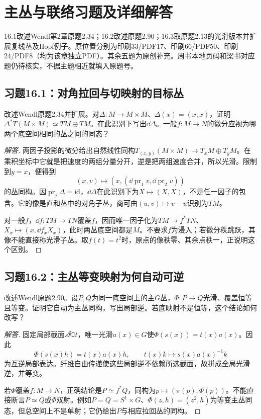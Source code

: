 \section{主丛与联络习题及详细解答}
16.1改述Wendl第2章原题2.34；16.2改述原题2.90；16.3取原题2.13的光滑版本并扩展复线丛及Hopf例子。原位置分别为印刷33/PDF17、印刷66/PDF50、印刷24/PDF8（均为该章独立PDF）。其余五题为原创补充。周书本地页码和梁书对应题仍待核实，不据主题相近就填入原题号。

\subsection*{习题16.1：对角拉回与切映射的目标丛}
改述Wendl原题2.34并扩展。对$\Delta:M\to M\times M$、$\Delta(x)=(x,x)$，证明$\Delta^*T(M\times M)\simeq TM\oplus TM$。在此识别下写出$\dd\Delta$。一般$f:M\to N$的微分应视为哪两个底空间相同的丛之间的同态？
\begin{proof}[解答]
两因子投影的微分给出自然线性同构$T_{(x,y)}(M\times M)\to T_xM\oplus T_yM$。在乘积坐标中它就是把速度的两组分量分开，逆是把两组速度合并，所以光滑。限制到$y=x$，便得到
\[
 (x,v)\longmapsto(x,(\dd\operatorname{pr}_1v,\dd\operatorname{pr}_2v))
\]
的丛同构。因$\operatorname{pr}_j\Delta=\mathrm{id}$，$\dd\Delta$在此识别下为$X\mapsto(X,X)$，不是任一因子的包含。它的像是直和丛中的对角子丛，商可由$(u,v)\mapsto v-u$识别为$TM$。

对一般$f$，$\dd f:TM\to TN$覆盖$f$，因而唯一因子化为$TM\to f^*TN$、$X_x\mapsto(x,\dd f_xX_x)$，此时两丛底空间都是$M$。不要求$f$为浸入；若微分秩跳跃，其像不能直接称光滑子丛。取$f(t)=t^2$时，原点的像秩零、其余点秩一，正说明这个区别。
\end{proof}

\subsection*{习题16.2：主丛等变映射为何自动可逆}
改述Wendl原题2.90。设$P,Q$为同一底空间上的主$G$丛，$\Phi:P\to Q$光滑、覆盖恒等且等变。证明它自动为主丛同构，写出局部逆。若底映射不是恒等，这个结论如何改写？
\begin{proof}[解答]
固定局部截面$s$和$t$，唯一光滑$a(x)\in G$使$\Phi(s(x))=t(x)a(x)$。因此
\[
 \Phi(s(x)h)=t(x)a(x)h,
 \qquad t(x)k\longmapsto s(x)a(x)^{-1}k
\]
为互逆局部表达。纤维自由传递使这些局部逆不依赖所选截面，故拼成全局光滑逆，并等变。

若$\Phi$覆盖$f:M\to N$，正确结论是$P\simeq f^*Q$，同构为$p\mapsto(\pi(p),\Phi(p))$。不能直接断言$P\simeq Q$或$\Phi$双射。例如$P=Q=S^1\times G$、$\Phi(z,h)=(z^2,h)$为等变主丛同态，但总空间上不是单射；它仍给出$P$与相应拉回丛的同构。
\end{proof}

